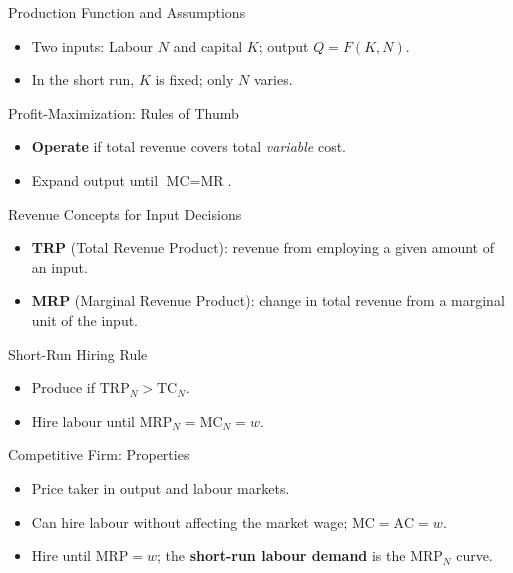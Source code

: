 \documentclass[aspectratio=169]{beamer}
\begin{document}
\begin{frame}{Production Function and Assumptions}
\transfade
\begin{itemize}[<+->]
  \item Two inputs: Labour \(N\) and capital \(K\); output \(Q=F(K,N)\).
  \item In the short run, \(K\) is fixed; only \(N\) varies.
\end{itemize}
\end{frame}

\begin{frame}{Profit-Maximization: Rules of Thumb}
\transfade
\begin{itemize}[<+->]
  \item \textbf{Operate} if total revenue covers total \emph{variable} cost.
  \item Expand output until \(\text{MC}=\text{MR}\).
\end{itemize}
\end{frame}

\begin{frame}{Revenue Concepts for Input Decisions}
\transfade
\begin{itemize}[<+->]
  \item \textbf{TRP} (Total Revenue Product): revenue from employing a given amount of an input.
  \item \textbf{MRP} (Marginal Revenue Product): change in total revenue from a marginal unit of the input.
\end{itemize}
\end{frame}

\begin{frame}{Short-Run Hiring Rule}
\transfade
\begin{itemize}[<+->]
  \item Produce if \(\text{TRP}_N > \text{TC}_N\).
  \item Hire labour until \(\text{MRP}_N = \text{MC}_N = w\).
\end{itemize}
\end{frame}

\begin{frame}{Competitive Firm: Properties}
\transfade
\begin{itemize}[<+->]
  \item Price taker in output and labour markets.
  \item Can hire labour without affecting the market wage; \(\text{MC}=\text{AC}=w\).
  \item Hire until \(\text{MRP}=w\); the \textbf{short-run labour demand} is the \(\text{MRP}_N\) curve.
\end{itemize}
\end{frame}
\end{document}
